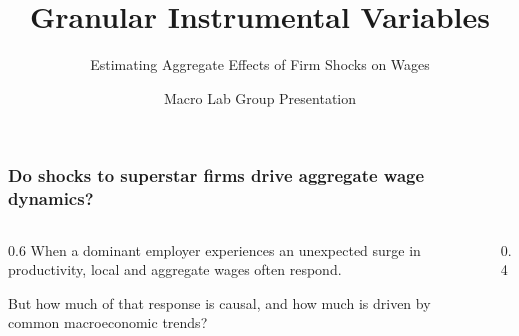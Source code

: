 \documentclass[aspectratio=169,11pt]{beamer}
\begin{document}
\begin{frame}
\title{Granular Instrumental Variables}
\subtitle{Estimating Aggregate Effects of Firm Shocks on Wages}
\author{Macro Lab Group Presentation}
\date{}
\titlepage
\end{frame}

\begin{frame}
\frametitle{Do shocks to superstar firms drive aggregate wage dynamics?}

\begin{columns}
\begin{column}{0.6\textwidth}
\vspace{0.5cm}
{\Large
When a dominant employer experiences an unexpected surge in productivity, local and aggregate wages often respond.
}

\vspace{0.8cm}
{\Large
But how much of that response is causal, and how much is driven by common macroeconomic trends?
}
\end{column}
\begin{column}{0.4\textwidth}
\begin{center}
\end{center}
\end{column}
\end{columns}

\end{frame}
\end{document}
